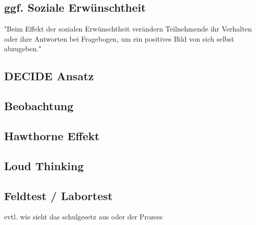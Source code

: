 \subsection{ggf. Soziale Erwünschtheit}
"Beim Effekt der sozialen Erwünschtheit verändern Teilnehmende ihr Verhalten oder ihre Antworten bei Fragebogen, um ein positives Bild von sich selbst abzugeben."

\subsection{DECIDE Ansatz}
\subsection{Beobachtung}
\subsection{Hawthorne Effekt}
\subsection{Loud Thinking}
\subsection{Feldtest / Labortest}

evtl. wie sieht das schulgesetz aus oder der Prozess

